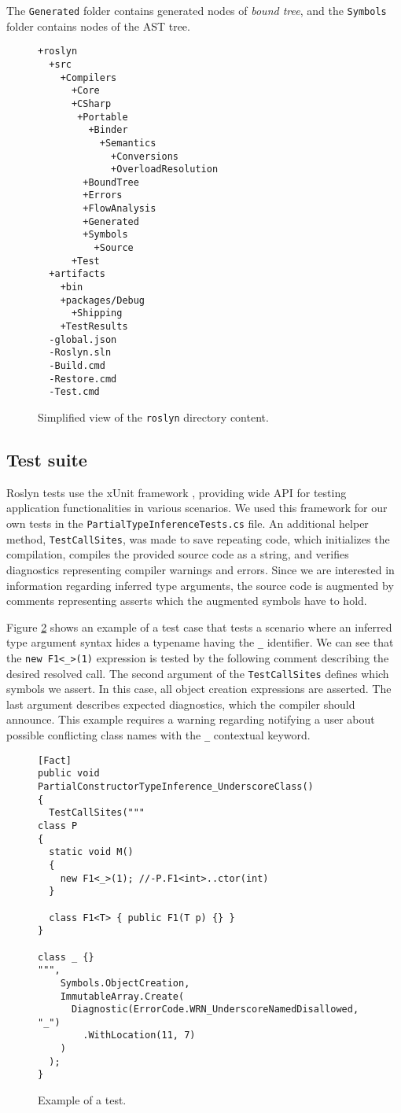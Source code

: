 The \texttt{Generated} folder contains generated nodes of \textit{bound tree}, and the \texttt{Symbols} folder contains nodes of the \ac{AST} tree.
\begin{figure}[h]
\begin{lstlisting}
+roslyn
  +src
    +Compilers
      +Core
      +CSharp
       +Portable
         +Binder
           +Semantics
             +Conversions
             +OverloadResolution
        +BoundTree
        +Errors
        +FlowAnalysis
        +Generated
        +Symbols
          +Source
      +Test
  +artifacts
    +bin
    +packages/Debug
      +Shipping
    +TestResults
  -global.json
  -Roslyn.sln
  -Build.cmd
  -Restore.cmd
  -Test.cmd
\end{lstlisting}
\caption{Simplified view of the \texttt{roslyn} directory content.}
\label{img68:roslynFolder}
\end{figure}

\subsection{Test suite}

Roslyn tests use the xUnit framework \cite{online:xUnit}, providing wide API for testing application functionalities in various scenarios. 
We used this framework for our own tests in the \texttt{PartialTypeInferenceTests.cs} file. 
An additional helper method, \texttt{TestCallSites}, was made to save repeating code, which initializes the compilation, compiles the provided source code as a string, and verifies diagnostics representing compiler warnings and errors. 
Since we are interested in information regarding inferred type arguments, the source code is augmented by comments representing asserts which the augmented symbols have to hold.
\par
Figure \ref{img69:test} shows an example of a test case that tests a scenario where an inferred type argument syntax hides a typename having the \texttt{\_}  identifier. 
We can see that the \texttt{new F1<\_>(1)} expression is tested by the following comment describing the desired resolved call. 
The second argument of the \texttt{TestCallSites} defines which symbols we assert. 
In this case, all object creation expressions are asserted. The last argument describes expected diagnostics, which the compiler should announce. 
This example requires a warning regarding notifying a user about possible conflicting class names with the \texttt{\_} contextual keyword.
\begin{figure}[h]
\begin{lstlisting}[style=csharp, showstringspaces=false]
[Fact]
public void PartialConstructorTypeInference_UnderscoreClass()
{
  TestCallSites("""
class P
{
  static void M() 
  {
    new F1<_>(1); //-P.F1<int>..ctor(int)
  }

  class F1<T> { public F1(T p) {} }
}

class _ {}
""",
    Symbols.ObjectCreation,
    ImmutableArray.Create(
      Diagnostic(ErrorCode.WRN_UnderscoreNamedDisallowed, "_")
        .WithLocation(11, 7)
    )
  );
}
\end{lstlisting}
\caption{Example of a test.}
\label{img69:test}
\end{figure}

